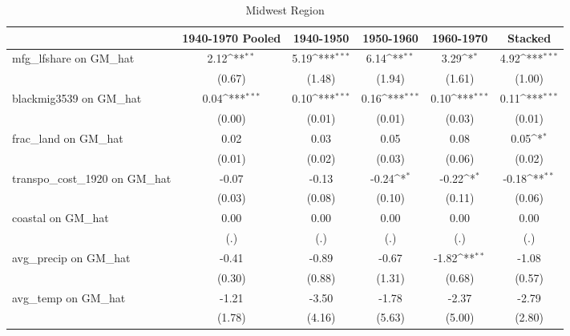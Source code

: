 \begin{table}[htbp]\centering
\def\sym#1{\ifmmode^{#1}\else\(^{#1}\)\fi}
\caption{Midwest Region}
\begin{tabular}{l*{5}{c}}
\toprule
                &\multicolumn{1}{c}{1940-1970 Pooled}&\multicolumn{1}{c}{1940-1950}&\multicolumn{1}{c}{1950-1960}&\multicolumn{1}{c}{1960-1970}&\multicolumn{1}{c}{Stacked}\\
\midrule
mfg\_lfshare on GM\_hat&     2.12\sym{**} &     5.19\sym{***}&     6.14\sym{**} &     3.29\sym{*}  &     4.92\sym{***}\\
                &   (0.67)         &   (1.48)         &   (1.94)         &   (1.61)         &   (1.00)         \\
\addlinespace
blackmig3539 on GM\_hat&     0.04\sym{***}&     0.10\sym{***}&     0.16\sym{***}&     0.10\sym{***}&     0.11\sym{***}\\
                &   (0.00)         &   (0.01)         &   (0.01)         &   (0.03)         &   (0.01)         \\
\addlinespace
frac\_land on GM\_hat&     0.02         &     0.03         &     0.05         &     0.08         &     0.05\sym{*}  \\
                &   (0.01)         &   (0.02)         &   (0.03)         &   (0.06)         &   (0.02)         \\
\addlinespace
transpo\_cost\_1920 on GM\_hat&    -0.07         &    -0.13         &    -0.24\sym{*}  &    -0.22\sym{*}  &    -0.18\sym{**} \\
                &   (0.03)         &   (0.08)         &   (0.10)         &   (0.11)         &   (0.06)         \\
\addlinespace
coastal on GM\_hat&     0.00         &     0.00         &     0.00         &     0.00         &     0.00         \\
                &      (.)         &      (.)         &      (.)         &      (.)         &      (.)         \\
\addlinespace
avg\_precip on GM\_hat&    -0.41         &    -0.89         &    -0.67         &    -1.82\sym{**} &    -1.08         \\
                &   (0.30)         &   (0.88)         &   (1.31)         &   (0.68)         &   (0.57)         \\
\addlinespace
avg\_temp on GM\_hat&    -1.21         &    -3.50         &    -1.78         &    -2.37         &    -2.79         \\
                &   (1.78)         &   (4.16)         &   (5.63)         &   (5.00)         &   (2.80)         \\

\end{tabular}
\end{table}
